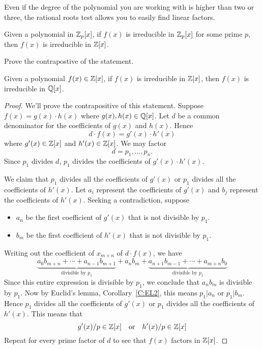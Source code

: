 \documentclass{ximera}
\begin{document}
Even if the degree of the polynomial you are working with is higher
than two or three, the rational roots test allows you to easily find
linear factors.


\begin{lemma}
  Given a polynomial in $\mathbb Z_p[x]$, if $f(x)$ is irreducible in
  $\mathbb Z_p[x]$ for some prime $p$, then $f(x)$ is irreducible in $\mathbb Z[x]$.
  \begin{sketch}
    Prove the contrapostive of the statement.
  \end{sketch}
\end{lemma}


\begin{lemma}
  Given a polynomial $f(x)\in\mathbb Z[x]$, if $f(x)$ is irreducible in
  $\mathbb Z[x]$, then $f(x)$ is irreducible in $\mathbb Q[x]$.
  \begin{proof}
    We'll prove the contrapositive of this statement. Suppose $f(x) =
    g(x)\cdot h(x)$ where $g(x),h(x)\in\mathbb Q[x]$. Let $d$ be a common
    denominator for the coefficients of $g(x)$ and $h(x)$. Hence
    \[
    d\cdot f(x) = g'(x)\cdot h'(x)
    \]
    where $g'(x)\in \mathbb Z[x]$ and $h'(x) \in\mathbb Z[x]$. We may factor
    \[
    d = p_1,\dots, p_n.
    \]
    Since $p_1$ divides $d$, $p_1$ divides the coefficients of
    $g'(x)\cdot h'(x)$.


    We claim that $p_1$ divides all the coefficients of $g'(x)$ or
    $p_1$ divides all the coefficients of $h'(x)$.  Let $a_i$
    represent the coefficients of $g'(x)$ and $b_j$ represent the
    coefficients of $h'(x)$. Seeking a contradiction, suppose 
    \begin{itemize}
      \item $a_n$ be the first coefficient of $g'(x)$ that is not
        divisible by $p_1$.
      \item $b_m$ be the first coefficient of $h'(x)$ that is not
        divisible by $p_1$.
    \end{itemize}
    Writing out the coefficient of $x_{m+n}$ of $d\cdot f(x)$, we have
    \[
    \underbrace{a_0b_{m+n}  + \cdots + a_{n-1}b_{m+1}}_{\text{divisible by $p_1$}} + a_nb_m + \underbrace{a_{n+1}b_{m-1} + \cdots + a_{m+n} b_0}_{\text{divisible by $p_1$}}
    \]
    Since this entire expression is divisible by $p_1$, we conclude
    that $a_nb_m$ is divisible by $p_1$. Now by Euclid's lemma,
    Corollary~\ref{C:EL2}, this means $p_1|a_n$ or $p_1|b_m$. Hence $p_1$
    divides all the coefficients of $g'(x)$ or $p_1$ divides all the
    coefficients of $h'(x)$. This means that
    \[
    g'(x)/p \in \mathbb Z[x] \quad\text{or}\quad h'(x)/p \in \mathbb Z[x]
    \]
    Repeat for every prime factor of $d$ to see that $f(x)$ factors in
    $\mathbb Z[x]$.
  \end{proof}
\end{lemma}
\end{document}
